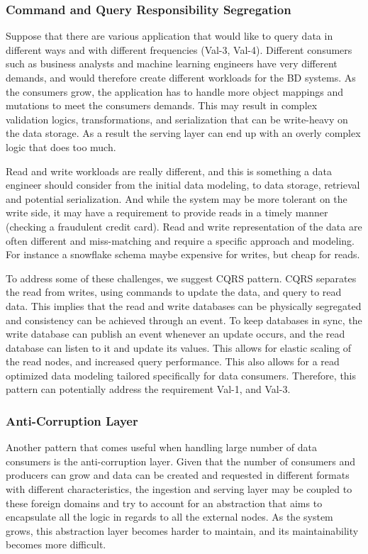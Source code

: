 \documentclass[a4paper,11pt,article,oneside]{memoir}
\begin{document}
\subsubsection{Command and Query Responsibility Segregation}

Suppose that there are various application that would like to query data in different ways and with different frequencies (Val-3, Val-4). Different consumers such as business analysts and machine learning engineers have very different demands, and would therefore create different workloads for the BD systems. As the consumers grow, the application has to handle more object mappings and mutations to meet the consumers demands. This may result in complex validation logics, transformations, and serialization that can be write-heavy on the data storage. As a result the serving layer can end up with an overly complex logic that does too much. 

Read and write workloads are really different, and this is something a data engineer should consider from the initial data modeling, to data storage, retrieval and potential serialization. And while the system may be more tolerant on the write side, it may have a requirement to provide reads in a timely manner (checking a fraudulent credit card). Read and write representation of the data are often different and miss-matching and require a specific approach and modeling. For instance a snowflake schema maybe expensive for writes, but cheap for reads. 

To address some of these challenges, we suggest CQRS pattern. CQRS separates the read from writes, using commands to update the data, and query to read data. This implies that the read and write databases can be physically segregated and consistency can be achieved through an event. To keep databases in sync, the write database can publish an event whenever an update occurs, and the read database can listen to it and update its values. This allows for elastic scaling of the read nodes, and increased query performance. This also allows for a read optimized data modeling tailored specifically for data consumers. Therefore, this pattern can potentially address the requirement Val-1, and Val-3. 

\subsubsection{Anti-Corruption Layer}

Another pattern that comes useful when handling large number of data consumers is the anti-corruption layer. Given that the number of consumers and producers can grow and data can be created and requested in different formats with different characteristics, the ingestion and serving layer may be coupled to these foreign domains and try to account for an abstraction that aims to encapsulate all the logic in regards to all the external nodes. As the system grows, this abstraction layer becomes harder to maintain, and its maintainability becomes more difficult. 
\end{document}
